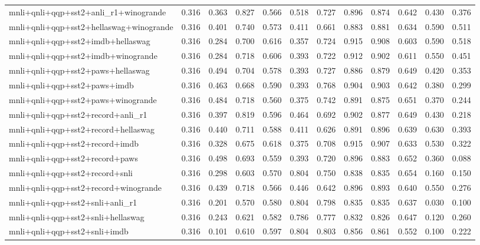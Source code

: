 \begin{table}[t]
\begin{tabular}{lrrrrrrrrrrr}
    mnli+qnli+qqp+sst2+anli\_r1+winogrande & 0.316 & 0.363 & 0.827 & 0.566 & 0.518 & 0.727 & 0.896 & 0.874 & 0.642 & 0.430 & 0.376 \\
    mnli+qnli+qqp+sst2+hellaswag+winogrande & 0.316 & 0.401 & 0.740 & 0.573 & 0.411 & 0.661 & 0.883 & 0.881 & 0.634 & 0.590 & 0.511 \\
    mnli+qnli+qqp+sst2+imdb+hellaswag & 0.316 & 0.284 & 0.700 & 0.616 & 0.357 & 0.724 & 0.915 & 0.908 & 0.603 & 0.590 & 0.518 \\
    mnli+qnli+qqp+sst2+imdb+winogrande & 0.316 & 0.284 & 0.718 & 0.606 & 0.393 & 0.722 & 0.912 & 0.902 & 0.611 & 0.550 & 0.451 \\
    mnli+qnli+qqp+sst2+paws+hellaswag & 0.316 & 0.494 & 0.704 & 0.578 & 0.393 & 0.727 & 0.886 & 0.879 & 0.649 & 0.420 & 0.353 \\
    mnli+qnli+qqp+sst2+paws+imdb & 0.316 & 0.463 & 0.668 & 0.590 & 0.393 & 0.768 & 0.904 & 0.903 & 0.642 & 0.380 & 0.299 \\
    mnli+qnli+qqp+sst2+paws+winogrande & 0.316 & 0.484 & 0.718 & 0.560 & 0.375 & 0.742 & 0.891 & 0.875 & 0.651 & 0.370 & 0.244 \\
    mnli+qnli+qqp+sst2+record+anli\_r1 & 0.316 & 0.397 & 0.819 & 0.596 & 0.464 & 0.692 & 0.902 & 0.877 & 0.649 & 0.430 & 0.218 \\
    mnli+qnli+qqp+sst2+record+hellaswag & 0.316 & 0.440 & 0.711 & 0.588 & 0.411 & 0.626 & 0.891 & 0.896 & 0.639 & 0.630 & 0.393 \\
    mnli+qnli+qqp+sst2+record+imdb & 0.316 & 0.328 & 0.675 & 0.618 & 0.375 & 0.708 & 0.915 & 0.907 & 0.633 & 0.530 & 0.322 \\
    mnli+qnli+qqp+sst2+record+paws & 0.316 & 0.498 & 0.693 & 0.559 & 0.393 & 0.720 & 0.896 & 0.883 & 0.652 & 0.360 & 0.088 \\
    mnli+qnli+qqp+sst2+record+snli & 0.316 & 0.298 & 0.603 & 0.570 & 0.804 & 0.750 & 0.838 & 0.835 & 0.654 & 0.160 & 0.150 \\
    mnli+qnli+qqp+sst2+record+winogrande & 0.316 & 0.439 & 0.718 & 0.566 & 0.446 & 0.642 & 0.896 & 0.893 & 0.640 & 0.550 & 0.276 \\
    mnli+qnli+qqp+sst2+snli+anli\_r1 & 0.316 & 0.201 & 0.570 & 0.580 & 0.804 & 0.798 & 0.835 & 0.835 & 0.637 & 0.030 & 0.100 \\
    mnli+qnli+qqp+sst2+snli+hellaswag & 0.316 & 0.243 & 0.621 & 0.582 & 0.786 & 0.777 & 0.832 & 0.826 & 0.647 & 0.120 & 0.260 \\
    mnli+qnli+qqp+sst2+snli+imdb & 0.316 & 0.101 & 0.610 & 0.597 & 0.804 & 0.803 & 0.856 & 0.861 & 0.552 & 0.100 & 0.222 \\

\end{tabular}
\end{table}
